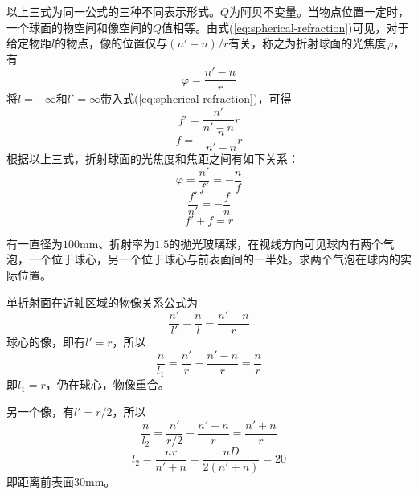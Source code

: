 \documentclass[cn,10pt,chinesefont=founder,math=newtx,cite=super,twoside]{elegantbook}
\begin{document}
以上三式为同一公式的三种不同表示形式。$Q$为阿贝不变量。当物点位置一定时，一个球面的物空间和像空间的$Q$值相等。由式(\ref{eq:spherical-refraction})可见，对于给定物距$l$的物点，像的位置仅与$(n'-n)/r$有关，称之为折射球面的光焦度$\varphi$，有
\begin{equation}
\varphi=\frac{n'-n}{r}
\end{equation}
将$l=-\infty$和$l'=\infty$带入式(\ref{eq:spherical-refraction})，可得
\begin{equation}
f'=\frac{n'}{n'-n}r
\label{eq:spherical-image-focal-length}
\end{equation}
\begin{equation}
f=-\frac{n}{n'-n}r
\label{eq:spherical-object-focal-length}
\end{equation}
根据以上三式，折射球面的光焦度和焦距之间有如下关系：
\begin{equation}
\varphi=\frac{n'}{f'}=-\frac{n}{f}
\end{equation}
\begin{equation}
\frac{f'}{n'}=-\frac{f}{n}
\end{equation}
\begin{equation}
f'+f=r
\end{equation}

\begin{problem}
	有一直径为$100\mathrm{mm}$、折射率为$1.5$的抛光玻璃球，在视线方向可见球内有两个气泡，一个位于球心，另一个位于球心与前表面间的一半处。求两个气泡在球内的实际位置。
\end{problem}
\begin{solution}
	单折射面在近轴区域的物像关系公式为
	\begin{equation}
	\frac{n'}{l'}-\frac{n}{l}=\frac{n'-n}{r}
	\end{equation}
	球心的像，即有$l'=r$，所以
	\begin{equation}
	\frac{n}{l_1}=\frac{n'}{r}-\frac{n'-n}{r}=\frac{n}{r}
	\end{equation}
	即$l_1=r$，仍在球心，物像重合。
	
	另一个像，有$l'=r/2$，所以
	\begin{equation}
	\frac{n}{l_2}=\frac{n'}{r/2}-\frac{n'-n}{r}=\frac{n'+n}{r}
	\end{equation}
	\begin{equation}
	l_2=\frac{nr}{n'+n}=\frac{nD}{2(n'+n)}=20
	\end{equation}
	即距离前表面$30\mathrm{mm}$。
\end{solution}
\end{document}
